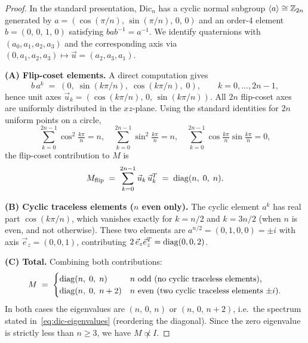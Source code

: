   \begin{proof}
    In the standard presentation, $\mathrm{Dic}_n$ has a cyclic normal subgroup
    $\langle a \rangle \cong \mathbb{Z}_{2n}$ generated by
    $a = (\cos(\pi/n),\, \sin(\pi/n),\, 0,\, 0)$
    and an order-4 element $b = (0,\, 0,\, 1,\, 0)$ satisfying $bab^{-1} = a^{-1}$.
    We identify quaternions with $(a_0, a_1, a_2, a_3)$ and the corresponding axis
    via $(0, a_1, a_2, a_3) \mapsto \vec{u} = (a_2, a_3, a_1)$.

    \medskip
    \textbf{(A) Flip-coset elements.}
    A direct computation gives
    \begin{equation}
      b\,a^k \;=\; (0,\; \sin(k\pi/n),\; \cos(k\pi/n),\; 0),
      \qquad k = 0, \ldots, 2n-1,
      \label{eq:dic-flip}
    \end{equation}
    hence unit axes $\vec{u}_k = (\cos(k\pi/n),\, 0,\, \sin(k\pi/n))$.
    All $2n$ flip-coset axes are uniformly distributed in the $xz$-plane.
    Using the standard identities for $2n$ uniform points on a circle,
    \[
      \sum_{k=0}^{2n-1} \cos^2\!\tfrac{k\pi}{n} = n, \quad
      \sum_{k=0}^{2n-1} \sin^2\!\tfrac{k\pi}{n} = n, \quad
      \sum_{k=0}^{2n-1} \cos\tfrac{k\pi}{n}\sin\tfrac{k\pi}{n} = 0,
    \]
    the flip-coset contribution to $M$ is
    \[
      M_{\mathrm{flip}}
      \;=\; \sum_{k=0}^{2n-1} \vec{u}_k\,\vec{u}_k^T
      \;=\; \mathrm{diag}(n,\; 0,\; n).
    \]

    \medskip
    \textbf{(B) Cyclic traceless elements ($n$ even only).}
    The cyclic element $a^k$ has real part $\cos(k\pi/n)$, which vanishes exactly for
    $k = n/2$ and $k = 3n/2$ (when $n$ is even, and not otherwise).
    These two elements are $a^{n/2} = (0, 1, 0, 0) = \pm i$ with axis $\vec{e}_z = (0,0,1)$,
    contributing $2\,\vec{e}_z\vec{e}_z^T = \mathrm{diag}(0, 0, 2)$.

    \medskip
    \textbf{(C) Total.}
    Combining both contributions:
    \[
      M \;=\;
      \begin{cases}
        \mathrm{diag}(n,\; 0,\; n)   & \text{$n$ odd (no cyclic traceless elements),} \\
        \mathrm{diag}(n,\; 0,\; n+2) & \text{$n$ even (two cyclic traceless elements $\pm i$).}
      \end{cases}
    \]
    In both cases the eigenvalues are $(n,\, 0,\, n)$ or $(n,\, 0,\, n+2)$,
    i.e.\ the spectrum stated in~\eqref{eq:dic-eigenvalues} (reordering the diagonal).
    Since the zero eigenvalue is strictly less than $n \ge 3$, we have $M \not\propto I$.
  \end{proof}

